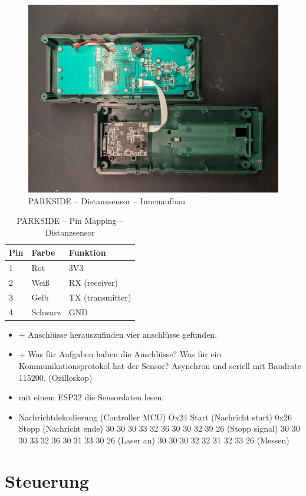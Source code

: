 \begin{figure}[ht]
	\begin{center}
		\includegraphics[width=1\textwidth]{img/2_sen/dis_parkside_1_outside.png}
		\caption{PARKSIDE – Distanzsensor – Innenaufbau}
		\label{img_2_2:sen_dis_parkside:1}
	\end{center}
\end{figure}


\begin{table}[ht]
	\centering
	\caption{PARKSIDE – Pin Mapping – Distanzsensor}
	\label{parkside:pinmapping}
	\begin{tabular}{l|ll}
		\hline
		\textbf{Pin} & \textbf{Farbe} & \textbf{Funktion} \\ \hline
		1            & Rot            & 3V3               \\
		2            & Weiß           & RX (receiver)     \\
		3            & Gelb           & TX (transmitter)  \\
		4            & Schwarz        & GND               \\ \hline
	\end{tabular}
\end{table}




\begin{itemize}
	\item + Anschlüsse herauszufinden vier anschlüsse gefunden.
	\item + Was für Aufgaben haben die Anschlüsse?
	      \subitem Was für ein Kommunikationsprotokol hat der Sensor?
	      \subitem Asynchron und seriell mit Baudrate 115200. (Ozilloskop)
	\item mit einem ESP32 die Sensordaten lesen.
	\item Nachrichtdekodierung (Controller MCU)
	      \subitem Ox24 Start (Nachricht start)
	      \subitem 0x26 Stopp (Nachricht ende)
	       30 30 30 33 32 36 30 30 32 39 26 (Stopp signal)
	       30 30 30 33 32 36 30 31 33 30 26 (Laser an)
	       30 30 30 32 32 31 32 33 26 (Messen)
\end{itemize}

\section{Steuerung}

